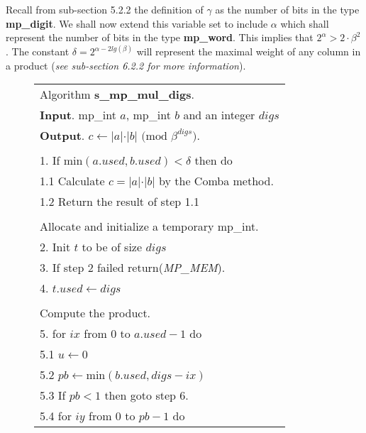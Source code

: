 \documentclass[b5paper]{book}
\begin{document}
Recall from sub-section 5.2.2 the definition of $\gamma$ as the number of bits in the type \textbf{mp\_digit}.  We shall now extend this variable set to 
include $\alpha$ which shall represent the number of bits in the type \textbf{mp\_word}.  This implies that $2^{\alpha} > 2 \cdot \beta^2$.  The 
constant $\delta = 2^{\alpha - 2lg(\beta)}$ will represent the maximal weight of any column in a product (\textit{see sub-section 6.2.2 for more information}).

\newpage\begin{figure}[!here]
\begin{small}
\begin{center}
\begin{tabular}{l}
\hline Algorithm \textbf{s\_mp\_mul\_digs}. \\
\textbf{Input}.   mp\_int $a$, mp\_int $b$ and an integer $digs$ \\
\textbf{Output}.  $c \leftarrow \vert a \vert \cdot \vert b \vert \mbox{ (mod }\beta^{digs}\mbox{)}$. \\
\hline \\
1.  If min$(a.used, b.used) < \delta$ then do \\
\hspace{3mm}1.1  Calculate $c = \vert a \vert \cdot \vert b \vert$ by the Comba method.  \\
\hspace{3mm}1.2  Return the result of step 1.1 \\
\\
Allocate and initialize a temporary mp\_int. \\
2.  Init $t$ to be of size $digs$ \\
3.  If step 2 failed return(\textit{MP\_MEM}). \\
4.  $t.used \leftarrow digs$ \\
\\
Compute the product. \\
5.  for $ix$ from $0$ to $a.used - 1$ do \\
\hspace{3mm}5.1  $u \leftarrow 0$ \\
\hspace{3mm}5.2  $pb \leftarrow \mbox{min}(b.used, digs - ix)$ \\
\hspace{3mm}5.3  If $pb < 1$ then goto step 6. \\
\hspace{3mm}5.4  for $iy$ from $0$ to $pb - 1$ do \\

\end{tabular}
\end{center}
\end{small}
\end{figure}
\end{document}
